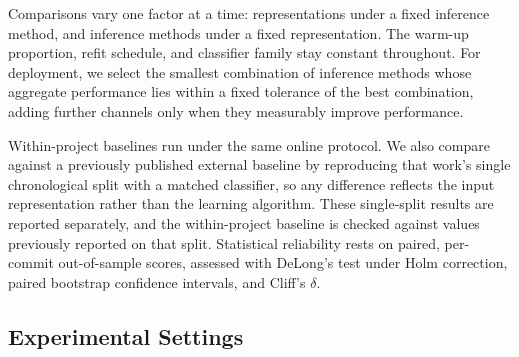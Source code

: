 \documentclass[final,5p,times,twocolumn]{elsarticle}
\theoremstyle{plain}
\begin{document}
Comparisons vary one factor at a time: representations under a fixed inference method, and inference methods under a fixed representation. The warm-up proportion, refit schedule, and classifier family stay constant throughout. For deployment, we select the smallest combination of inference methods whose aggregate performance lies within a fixed tolerance of the best combination, adding further channels only when they measurably improve performance.

Within-project baselines run under the same online protocol. We also compare against a previously published external baseline by reproducing that work's single chronological split with a matched classifier, so any difference reflects the input representation rather than the learning algorithm. These single-split results are reported separately, and the within-project baseline is checked against values previously reported on that split. Statistical reliability rests on paired, per-commit out-of-sample scores, assessed with DeLong's test under Holm correction, paired bootstrap confidence intervals, and Cliff's $\delta$.

\subsection{Experimental Settings}
\label{sec:setup-settings-section}
\end{document}
